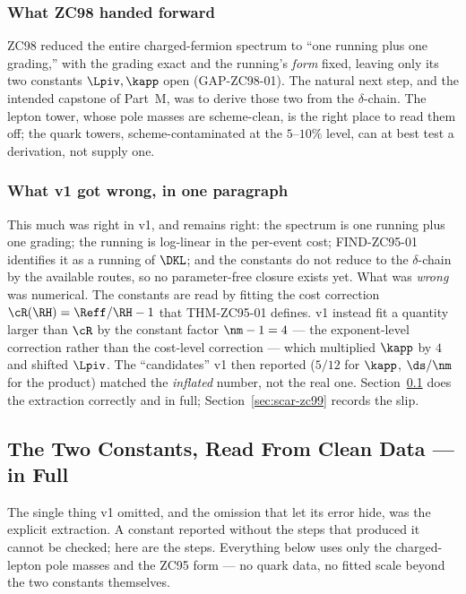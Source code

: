 \documentclass[12pt, a4paper]{article}
\begin{document}
\subsubsection{What ZC98 handed forward}

ZC98 reduced the entire charged-fermion spectrum to ``one running plus one
grading,'' with the grading exact and the running's \emph{form} fixed, leaving
only its two constants $\Lpiv,\kapp$ open (GAP-ZC98-01). The natural next step,
and the intended capstone of Part~M, was to derive those two from the
$\delta$-chain. The lepton tower, whose pole masses are scheme-clean, is the
right place to read them off; the quark towers, scheme-contaminated at the
$5$--$10\%$ level, can at best test a derivation, not supply one.

\subsubsection{What v1 got wrong, in one paragraph}

This much was right in v1, and remains right: the spectrum is one running plus
one grading; the running is log-linear in the per-event cost; FIND-ZC95-01
identifies it as a running of $\DKL$; and the constants do not reduce to the
$\delta$-chain by the available routes, so no parameter-free closure exists yet.
What was \emph{wrong} was numerical. The constants are read by fitting the
cost correction $\cR(\RH)=\Reff/\RH-1$ that THM-ZC95-01 defines. v1 instead fit
a quantity larger than $\cR$ by the constant factor $\nm-1=4$ --- the
exponent-level correction rather than the cost-level correction --- which
multiplied $\kapp$ by $4$ and shifted $\Lpiv$. The ``candidates'' v1 then
reported ($5/12$ for $\kapp$, $\ds/\nm$ for the product) matched the
\emph{inflated} number, not the real one. Section~\ref{sec:extract-zc99} does the
extraction correctly and in full; Section~\ref{sec:scar-zc99} records the slip.

\subsection{The Two Constants, Read From Clean Data --- in Full}
\label{sec:extract-zc99}

The single thing v1 omitted, and the omission that let its error hide, was the
explicit extraction. A constant reported without the steps that produced it
cannot be checked; here are the steps. Everything below uses only the
charged-lepton pole masses and the ZC95 form --- no quark data, no fitted scale
beyond the two constants themselves.
\end{document}
